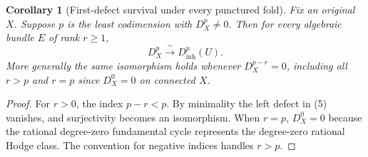 \documentclass[11pt]{article}
\newtheorem{corollary}{Corollary}
\begin{document}
\begin{corollary}[First-defect survival under every punctured fold]
Fix an original $X$. Suppose $p$ is the least codimension
with $D_X^p\ne0$. Then for every algebraic bundle $E$ of
rank $r\ge1$,
\[
  \boxed{D_X^p\xrightarrow{\ \sim\ }D_{\mathrm{inh}}^p(U).}
                                                               \tag{8}
\]
More generally the same isomorphism holds whenever
$D_X^{p-r}=0$, including all $r>p$ and $r=p$ since
$D_X^0=0$ on connected $X$.
\end{corollary}
\begin{proof}
For $r>0$, the index $p-r<p$. By minimality the left
defect in (5) vanishes, and surjectivity becomes an
isomorphism. When $r=p$, $D_X^0=0$ because the rational
degree-zero fundamental cycle represents the degree-zero
rational Hodge class. The convention for negative indices
handles $r>p$.
\end{proof}
\end{document}
